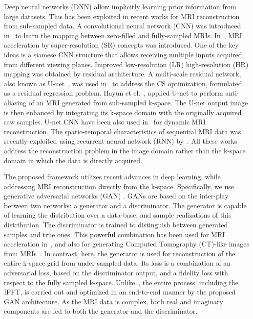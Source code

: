 \documentclass[10pt,journal,compsoc]{IEEEtran}
\begin{document}
Deep neural networks (DNN) allow implicitly learning prior information from large datasets. This has been exploited in recent works for MRI reconstruction from sub-sampled data. A convolutional neural network (CNN) was introduced in~\cite{wang2016accelerating} to learn the mapping between zero-filled and fully-sampled MRIs.
In~\cite{Oktay2016}, MRI acceleration by super-resolution (SR) concepts was introduced. One of the key ideas is a siamese CNN structure that allows receiving multiple inputs acquired from different viewing planes. Improved low-resolution (LR) high-resolution (HR) mapping was obtained by residual architecture.
A multi-scale residual network, also known as U-net~\cite{ronneberger2015u}, was used in~\cite{lee2017deep} to address the CS optimization, formulated as a residual regression problem.
Hayun et el.~\cite{hyun2017deep}, applied U-net to perform anti-aliasing of an MRI generated from sub-sampled k-space. The U-net output image is then enhanced by integrating its k-space domain with the originally acquired raw samples. U-net CNN have been also used in~\cite{sandinodeep} for dynamic MRI reconstruction.
The spatio-temporal characteristics of sequential MRI data was recently exploited using recurrent neural network (RNN) by~\cite{qin2017convolutional}. All these works address the reconstruction problem in the image domain rather than the k-space domain in which the data is directly acquired.

The proposed framework utilizes recent advances in deep learning, while addressing MRI reconstruction directly from the k-space. Specifically, we use generative adversarial networks (GAN) \cite{goodfellow2014generative,radford2015unsupervised,pathak2016context}.
GANs are based on the inter-play between two networks: a generator and a discriminator. The generator is capable of learning the distribution over a data-base, and sample realizations of this distribution. 
The discriminator is trained to distinguish between generated samples and true ones. This powerful combination has been used for MRI acceleration in~\cite{yu2017deep,mardani2017deep}, and also for generating Computed Tomography (CT)-like images from MRIs~\cite{nie2016medical}.
In contrast, here, the generator is used for reconstruction of the entire k-space grid from under-sampled data. Its loss is a combination of an adversarial loss, based on the discriminator output, and a fidelity loss with respect to the fully sampled k-space. Unlike~\cite{hyun2017deep}, the entire process, including the IFFT, is carried out and optimized in an end-to-end manner by the proposed GAN architecture. As the MRI data is complex, both real and imaginary components are fed to both the generator and the discriminator. 
\end{document}
